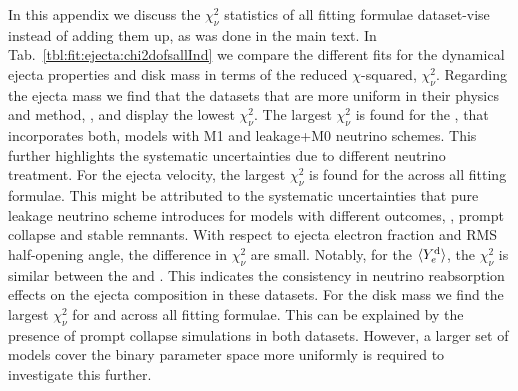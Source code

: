 In this appendix we discuss the $\chi_\nu^2$ statistics of all fitting formulae 
dataset-vise instead of adding them up, as was done in the main text.
In Tab.~\ref{tbl:fit:ejecta:chi2dofsallInd} we compare the different fits 
for the dynamical ejecta properties and disk mass in terms of the reduced 
$\chi$-squared, $\chi^2 _{\nu}$.
Regarding the ejecta mass we find that the datasets that are 
more uniform in their physics and method, \eg, \DSrefset{} and 
\DScool{} display the lowest $\chi^2 _{\nu}$.
The largest $\chi^2 _{\nu}$ is found for the \DSheatcool{}, that 
incorporates both, models with M1 and leakage+M0 neutrino schemes. 
This further highlights the systematic uncertainties due 
to different neutrino treatment. 
For the ejecta velocity, the largest $\chi^2 _{\nu}$ is found 
for the \DScool{} across all fitting formulae. 
This might be attributed to the systematic uncertainties that pure 
leakage neutrino scheme introduces for models with different outcomes, \eg,
prompt collapse and stable remnants. 
With respect to ejecta electron fraction and RMS half-opening angle, 
the difference in $\chi^2 _{\nu}$ are small. Notably, for the 
$\langle Y^{\text{d}}_{e}\rangle$, the $\chi^2 _{\nu}$ is similar between the \DSrefset{}
and \DSheatcool{}. This indicates the consistency in neutrino reabsorption 
effects on the ejecta composition in these datasets.
For the disk mass we find the largest $\chi^2 _{\nu}$ for \DSrefset{} 
and \DScool{} across all fitting formulae. 
This can be explained by the presence of prompt collapse simulations 
in both datasets.
However, a larger set of models cover the binary parameter space more 
uniformly is required to investigate this further.





